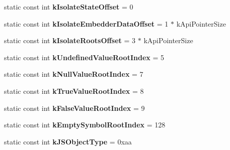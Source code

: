 \begin{DoxyCompactItemize}
\item 
\hypertarget{classv8_1_1internal_1_1_internals_af591f991ecb24f9f6b33209e33b0d9ef}{}static const int {\bfseries k\+Isolate\+State\+Offset} = 0\label{classv8_1_1internal_1_1_internals_af591f991ecb24f9f6b33209e33b0d9ef}

\item 
\hypertarget{classv8_1_1internal_1_1_internals_ad722bf4760df09958cd1062db4a5524c}{}static const int {\bfseries k\+Isolate\+Embedder\+Data\+Offset} = 1 $\ast$ k\+Api\+Pointer\+Size\label{classv8_1_1internal_1_1_internals_ad722bf4760df09958cd1062db4a5524c}

\item 
\hypertarget{classv8_1_1internal_1_1_internals_a3142f942a25203ce7fca0e9a4563c74d}{}static const int {\bfseries k\+Isolate\+Roots\+Offset} = 3 $\ast$ k\+Api\+Pointer\+Size\label{classv8_1_1internal_1_1_internals_a3142f942a25203ce7fca0e9a4563c74d}

\item 
\hypertarget{classv8_1_1internal_1_1_internals_a7281ff0eafed559e64613465b1a03296}{}static const int {\bfseries k\+Undefined\+Value\+Root\+Index} = 5\label{classv8_1_1internal_1_1_internals_a7281ff0eafed559e64613465b1a03296}

\item 
\hypertarget{classv8_1_1internal_1_1_internals_ab311cf753ec5c968052bd83ef21e83f8}{}static const int {\bfseries k\+Null\+Value\+Root\+Index} = 7\label{classv8_1_1internal_1_1_internals_ab311cf753ec5c968052bd83ef21e83f8}

\item 
\hypertarget{classv8_1_1internal_1_1_internals_a93abd58b178eca469bade28e68b5c59e}{}static const int {\bfseries k\+True\+Value\+Root\+Index} = 8\label{classv8_1_1internal_1_1_internals_a93abd58b178eca469bade28e68b5c59e}

\item 
\hypertarget{classv8_1_1internal_1_1_internals_a90b6837aa368bbe4ffd914e6f753b167}{}static const int {\bfseries k\+False\+Value\+Root\+Index} = 9\label{classv8_1_1internal_1_1_internals_a90b6837aa368bbe4ffd914e6f753b167}

\item 
\hypertarget{classv8_1_1internal_1_1_internals_a424505ca99d031da8350e1fa45af8ed2}{}static const int {\bfseries k\+Empty\+Symbol\+Root\+Index} = 128\label{classv8_1_1internal_1_1_internals_a424505ca99d031da8350e1fa45af8ed2}

\item 
\hypertarget{classv8_1_1internal_1_1_internals_a56b7062df5d9a7df491137d4c3341bcc}{}static const int {\bfseries k\+J\+S\+Object\+Type} = 0xaa\label{classv8_1_1internal_1_1_internals_a56b7062df5d9a7df491137d4c3341bcc}


\end{DoxyCompactItemize}

